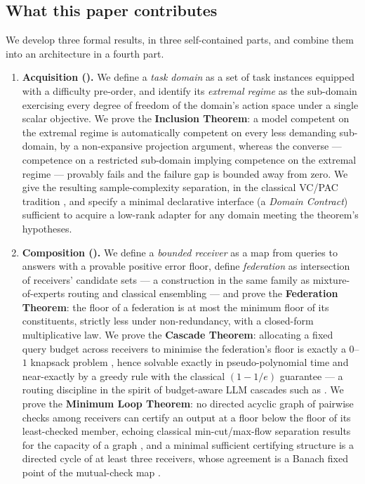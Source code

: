 \documentclass[11pt,twocolumn,a4paper]{article}
\theoremstyle{rdm}
\theoremstyle{definition}
\theoremstyle{remark}
\begin{document}
\subsection{What this paper contributes}

We develop three formal results, in three self-contained parts, and combine
them into an architecture in a fourth part.

\begin{enumerate}[leftmargin=*,itemsep=2pt]
\item \textbf{Acquisition ().} We define a \emph{task
domain} as a set of task instances equipped with a difficulty pre-order, and
identify its \emph{extremal regime} as the sub-domain exercising every degree
of freedom of the domain's action space under a single scalar objective. We
prove the \textbf{Inclusion Theorem}: a model competent on the extremal
regime is automatically competent on every less demanding sub-domain, by a
non-expansive projection argument, whereas the converse --- competence on a
restricted sub-domain implying competence on the extremal regime --- provably
fails and the failure gap is bounded away from zero. We give the resulting
sample-complexity separation, in the classical VC/PAC tradition
\citep{vapnik1998,valiant1984,blumer1989,shalevshwartz2014}, and specify a
minimal declarative interface (a \emph{Domain Contract}) sufficient to
acquire a low-rank adapter \citep{hu2022lora,houlsby2019} for any domain
meeting the theorem's hypotheses.

\item \textbf{Composition ().} We define a \emph{bounded
receiver} as a map from queries to answers with a provable positive error
floor, define \emph{federation} as intersection of receivers' candidate sets
--- a construction in the same family as mixture-of-experts routing and
classical ensembling
\citep{jacobs1991,shazeer2017,dietterich2000,breiman2001,wolpert1992} ---
and prove the \textbf{Federation Theorem}: the floor of a federation is at
most the minimum floor of its constituents, strictly less under
non-redundancy, with a closed-form multiplicative law. We prove the
\textbf{Cascade Theorem}: allocating a fixed query budget across receivers to
minimise the federation's floor is exactly a $0$--$1$ knapsack problem
\citep{dantzig1957,kellerer2004}, hence solvable exactly in
pseudo-polynomial time and near-exactly by a greedy rule with the classical
$(1-1/e)$ guarantee \citep{ibarra1975} --- a routing discipline in the
spirit of budget-aware LLM cascades such as \citet{chenfrugalgpt2023}. We
prove the \textbf{Minimum Loop Theorem}: no directed acyclic graph of
pairwise checks among receivers can certify an output at a floor below the
floor of its least-checked member, echoing classical min-cut/max-flow
separation results for the capacity of a graph
\citep{menger1927,fordfulkerson1956,edmondskarp1972,stoer1997}, and a
minimal sufficient certifying structure is a directed cycle of at least
three receivers, whose agreement is a Banach fixed point of the mutual-check
map \citep{banach1922}.


\end{enumerate}
\end{document}
